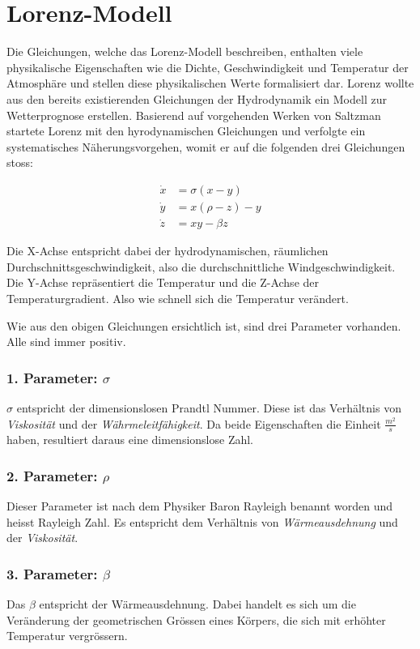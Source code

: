 

\section{Lorenz-Modell}
Die Gleichungen, welche das Lorenz-Modell beschreiben, enthalten viele physikalische Eigenschaften wie die Dichte, Geschwindigkeit und Temperatur der Atmosphäre und stellen diese physikalischen Werte formalisiert dar. Lorenz wollte aus den bereits existierenden Gleichungen der Hydrodynamik ein Modell zur Wetterprognose erstellen. Basierend auf vorgehenden Werken von Saltzman startete Lorenz mit den hyrodynamischen Gleichungen und verfolgte ein systematisches Näherungsvorgehen, womit er auf die folgenden drei Gleichungen stoss:

\begin{align}
\dot{x} &= \sigma(x - y)\\
\dot{y} &= x(\rho - z) - y\\
\dot{z} &= xy - \beta z
\end{align}

Die X-Achse entspricht dabei der hydrodynamischen, räumlichen Durchschnittsgeschwindigkeit, also die durchschnittliche Windgeschwindigkeit. Die Y-Achse repräsentiert die Temperatur und die Z-Achse der Temperaturgradient. Also wie schnell sich die Temperatur verändert. 

Wie aus den obigen Gleichungen ersichtlich ist, sind drei Parameter vorhanden. Alle sind immer positiv.

\subsubsection{1. Parameter: $\sigma$}
$\sigma$ entspricht der dimensionslosen Prandtl Nummer. Diese ist das Verhältnis von \textit{Viskosität} und der \textit{Währmeleitfähigkeit}. Da beide Eigenschaften die Einheit $\frac{m^2}{s}$ haben, resultiert daraus eine dimensionslose Zahl.

\subsubsection{2. Parameter: $\rho$}
Dieser Parameter ist nach dem Physiker Baron Rayleigh benannt worden und heisst Rayleigh Zahl. Es entspricht dem Verhältnis von \textit{Wärmeausdehnung} und der \textit{Viskosität}.

\subsubsection{3. Parameter: $\beta$}
Das $ \beta $ entspricht der Wärmeausdehnung. Dabei handelt es sich um die Veränderung der geometrischen Grössen eines Körpers, die sich mit erhöhter Temperatur vergrössern.


